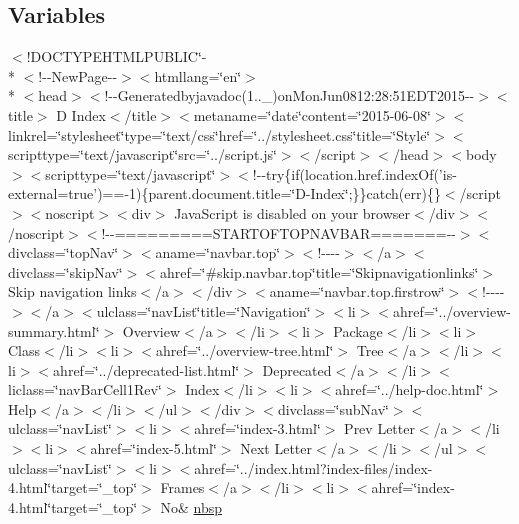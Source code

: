 \subsection*{Variables}
\begin{DoxyCompactItemize}
\item 
$<$!D\-O\-C\-T\-Y\-P\-E\-H\-T\-M\-L\-P\-U\-B\-L\-I\-C\char`\"{}-\/\\*
$<$!-\/-\/New\-Page-\/-\/$>$$<$htmllang=\char`\"{}en\char`\"{}$>$\\*
$<$head$>$$<$!-\/-\/Generatedbyjavadoc(1..\-\_)on\-Mon\-Jun0812\-:28\-:51\-E\-D\-T2015-\/-\/$>$$<$title$>$ D Index$<$/title$>$$<$metaname=\char`\"{}date\char`\"{}content=\char`\"{}2015-\/06-\/08\char`\"{}$>$$<$linkrel=\char`\"{}stylesheet\char`\"{}type=\char`\"{}text/css\char`\"{}href=\char`\"{}../stylesheet.\-css\char`\"{}title=\char`\"{}\-Style\char`\"{}$>$$<$scripttype=\char`\"{}text/javascript\char`\"{}src=\char`\"{}../script.\-js\char`\"{}$>$$<$/script$>$$<$/head$>$$<$body$>$$<$scripttype=\char`\"{}text/javascript\char`\"{}$>$$<$!-\/-\/try\{if(location.\-href.\-index\-Of('is-\/external=true')==-\/1)\{parent.\-document.\-title=\char`\"{}\-D-\/\-Index\char`\"{};\}\}catch(err)\{\}$<$/script$>$$<$noscript$>$$<$div$>$ Java\-Script is disabled on your browser$<$/div$>$$<$/noscript$>$$<$!-\/-\/=========\-S\-T\-A\-R\-T\-O\-F\-T\-O\-P\-N\-A\-V\-B\-A\-R=======-\/-\/$>$$<$divclass=\char`\"{}top\-Nav\char`\"{}$>$$<$aname=\char`\"{}navbar.\-top\char`\"{}$>$$<$!-\/-\/-\/-\/$>$$<$/a$>$$<$divclass=\char`\"{}skip\-Nav\char`\"{}$>$$<$ahref=\char`\"{}\#skip.\-navbar.\-top\char`\"{}title=\char`\"{}\-Skipnavigationlinks\char`\"{}$>$ Skip navigation links$<$/a$>$$<$/div$>$$<$aname=\char`\"{}navbar.\-top.\-firstrow\char`\"{}$>$$<$!-\/-\/-\/-\/$>$$<$/a$>$$<$ulclass=\char`\"{}nav\-List\char`\"{}title=\char`\"{}\-Navigation\char`\"{}$>$$<$li$>$$<$ahref=\char`\"{}../overview-\/summary.\-html\char`\"{}$>$ Overview$<$/a$>$$<$/li$>$$<$li$>$ Package$<$/li$>$$<$li$>$ Class$<$/li$>$$<$li$>$$<$ahref=\char`\"{}../overview-\/tree.\-html\char`\"{}$>$ Tree$<$/a$>$$<$/li$>$$<$li$>$$<$ahref=\char`\"{}../deprecated-\/list.\-html\char`\"{}$>$ Deprecated$<$/a$>$$<$/li$>$$<$liclass=\char`\"{}nav\-Bar\-Cell1\-Rev\char`\"{}$>$ Index$<$/li$>$$<$li$>$$<$ahref=\char`\"{}../help-\/doc.\-html\char`\"{}$>$ Help$<$/a$>$$<$/li$>$$<$/ul$>$$<$/div$>$$<$divclass=\char`\"{}sub\-Nav\char`\"{}$>$$<$ulclass=\char`\"{}nav\-List\char`\"{}$>$$<$li$>$$<$ahref=\char`\"{}index-\/3.\-html\char`\"{}$>$ Prev Letter$<$/a$>$$<$/li$>$$<$li$>$$<$ahref=\char`\"{}index-\/5.\-html\char`\"{}$>$ Next Letter$<$/a$>$$<$/li$>$$<$/ul$>$$<$ulclass=\char`\"{}nav\-List\char`\"{}$>$$<$li$>$$<$ahref=\char`\"{}../index.\-html?index-\/files/index-\/4.\-html\char`\"{}target=\char`\"{}\-\_\-top\char`\"{}$>$ Frames$<$/a$>$$<$/li$>$$<$li$>$$<$ahref=\char`\"{}index-\/4.\-html\char`\"{}target=\char`\"{}\-\_\-top\char`\"{}$>$ No\& \hyperlink{index-4_8html_a479d00f21dbca369efe3be97f1ef785a}{nbsp}
\end{DoxyCompactItemize}


